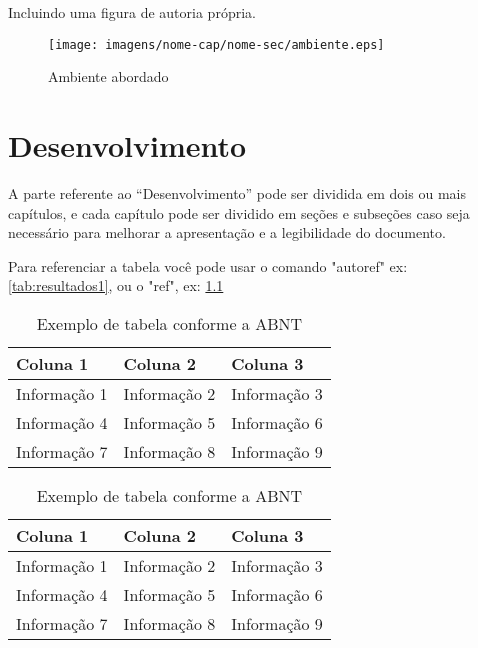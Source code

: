 Incluindo uma figura de autoria própria.
\begin{figure} [htb]
\begin{center}
	 \caption{\label{fig:ambiente}Ambiente abordado}
	    \texttt{[image: imagens/nome-cap/nome-sec/ambiente.eps]}
    \end{center}
\end{figure}


\chapter{Desenvolvimento} \label{ch:definir-um-label-titulo-de-capitulo}
A parte referente ao ``Desenvolvimento'' pode ser dividida em dois ou mais capítulos, e cada capítulo pode ser dividido em seções e subseções caso seja necessário para melhorar a apresentação e a legibilidade do documento.

Para referenciar a tabela você pode usar o comando "autoref" ex: \autoref{tab:resultados1}, ou o "ref", ex: \ref{tab:resultados1}

\begin{table}[htb]
\centering
\caption{Exemplo de tabela conforme a ABNT}
\label{tab:resultados1}
\begin{tabular}{p{} p{} p{}} %
    \hline
    \textbf{Coluna 1} & \textbf{Coluna 2} & \textbf{Coluna 3} \\
    \hline
    Informação 1 & Informação 2 & Informação 3 \\
    Informação 4 & Informação 5 & Informação 6 \\
    Informação 7 & Informação 8 & Informação 9 \\  
    \hline
\end{tabular}
\end{table}

\begin{table}[htb]
\centering
\caption{Exemplo de tabela conforme a ABNT}
\label{tab:resultados2}
\begin{tabular}{>{\centering\arraybackslash}p{}  >{\centering\arraybackslash}p{}  >{\centering\arraybackslash}p{}} %
    \hline
    \textbf{Coluna 1} & \textbf{Coluna 2} & \textbf{Coluna 3} \\
    \hline
    Informação 1 & Informação 2 & Informação 3 \\
    Informação 4 & Informação 5 & Informação 6 \\
    Informação 7 & Informação 8 & Informação 9 \\  
    \hline
\end{tabular}
\end{table}




